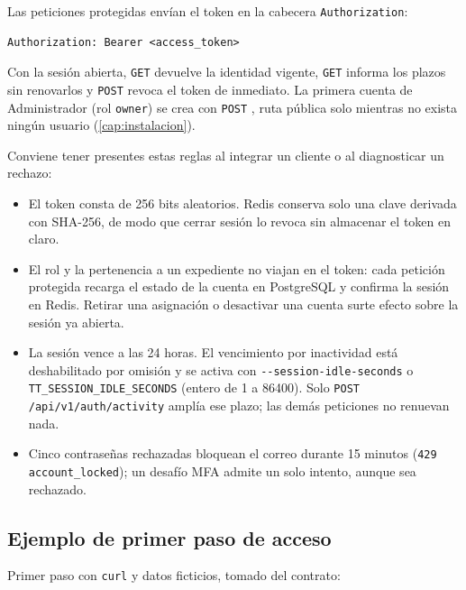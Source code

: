 Las peticiones protegidas envían el token en la cabecera
\texttt{Authorization}:

\begin{verbatim}
Authorization: Bearer <access_token>
\end{verbatim}

Con la sesión abierta, \texttt{GET}  devuelve la
identidad vigente, \texttt{GET}  informa los
plazos sin renovarlos y \texttt{POST}  revoca el
token de inmediato. La primera cuenta de Administrador (rol \texttt{owner})
se crea con \texttt{POST}
, ruta pública solo mientras no exista ningún
usuario (\cref{cap:instalacion}).

Conviene tener presentes estas reglas al integrar un cliente o al diagnosticar
un rechazo:

\begin{itemize}
  \item El token consta de 256 bits aleatorios. Redis conserva solo una clave
        derivada con SHA-256, de modo que cerrar sesión lo revoca sin
        almacenar el token en claro.
  \item El rol y la pertenencia a un expediente no viajan en el token: cada
        petición protegida recarga el estado de la cuenta en PostgreSQL y
        confirma la sesión en Redis. Retirar una asignación o desactivar una
        cuenta surte efecto sobre la sesión ya abierta.
  \item La sesión vence a las 24 horas. El vencimiento por inactividad está
        deshabilitado por omisión y se activa con
        \texttt{-{}-session-idle-seconds} o
        \texttt{TT\_SESSION\_IDLE\_SECONDS} (entero de 1 a 86400). Solo
        \texttt{POST /api/v1/auth/activity} amplía ese plazo; las demás
        peticiones no renuevan nada.
  \item Cinco contraseñas rechazadas bloquean el correo durante 15 minutos
        (\texttt{429 account\_locked}); un desafío MFA admite un solo
        intento, aunque sea rechazado.
\end{itemize}

\subsection{Ejemplo de primer paso de acceso}\label{sec:api-ejemplo}

Primer paso con \texttt{curl} y datos ficticios, tomado del contrato:

